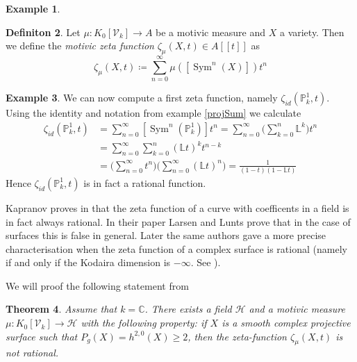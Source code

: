 \documentclass[11pt, a4paper, german]{article}
\theoremstyle{plain}
\newtheorem{theorem}{Theorem}[section]
\theoremstyle{definition}
\newtheorem{definition}[theorem]{Definiton}
\newtheorem{example}[theorem]{Example}
\newcommand{\gring}[1][k]{K_0[\mathcal{V}_#1]}
\DeclareMathOperator{\Sym}{Sym}
\begin{document}
\begin{example}
    
\end{example}

\begin{definition}
    Let $\mu \colon \gring \to A$ be a motivic measure and $X$ a variety. Then we define the \emph{motivic zeta function} 
    $\zeta_{\mu}(X,t) \in A[[t]]$ as
    \[
        \zeta_{\mu}(X,t) \coloneqq \sum_{n=0}^\infty \mu([\Sym^n(X)])t^n
    \]
\end{definition}

\begin{example}
    We can now compute a first zeta function, namely $\zeta_{id}(\mathbb{P}_k^1, t)$. Using the identity and notation from example \ref{projSum}
    we calculate
    \begin{align*}
        \zeta_{id}(\mathbb{P}_k^1, t) & = \sum_{n=0}^\infty [\Sym^n({\mathbb{P}_k^1})]t^n 
                                       = \sum_{n=0}^\infty \big(\sum_{k=0}^n \mathbb{L}^k\big) t^n \\
                                       & = \sum_{n=0}^\infty \sum_{k=0}^n (\mathbb{L}t)^k t^{n-k} \\
                                      & = \Big( \sum_{n=0}^\infty t^n \Big) \Big( \sum_{n=0}^\infty (\mathbb{L}t)^n \Big) 
                                        = \frac{1}{(1-t)(1-\mathbb{L}t)} %
    \end{align*}
    Hence $\zeta_{id}(\mathbb{P}_k^1, t)$ is in fact a rational function.
\end{example}

Kapranov proves in \cite{kapranov} that the zeta function of a curve with coefficents in a field is in fact always rational. 
In their paper \cite{MR1996804} Larsen and Lunts prove that in the case of surfaces this is false in general.
Later the same authors gave a more precise characterisation when the zeta function of a complex surface is rational 
(namely if and only if the Kodaira dimension is $-\infty$. See \cite{LL2}).

We will proof the following statement from \cite{MR1996804}
\begin{theorem}
    \label{irrational}
    Assume that $k = \mathbb{C}$. There exists a field $\mathcal{H}$ and a motivic measure $\mu \colon \gring \to \mathcal{H}$ with the following
    property: if $X$ is a smooth complex projective surface such that $P_g(X)=h^{2,0}(X) \ge 2$, then the zeta-function $\zeta_{\mu}(X,t)$
    is not rational.
\end{theorem}
\end{document}
